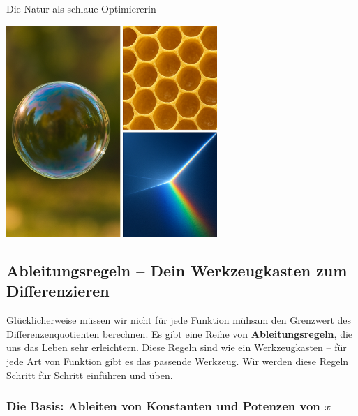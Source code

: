 \begin{funfactbox}{Die Natur als schlaue Optimiererin}
\begin{center}
    \includegraphics[width=0.6\textwidth]{grafiken/Natur_Optimierung.png}
    \label{fig:natur_optimierung_funfact} %
\end{center}
\end{funfactbox}

\subsection{Ableitungsregeln – Dein Werkzeugkasten zum Differenzieren}

Glücklicherweise müssen wir nicht für jede Funktion mühsam den Grenzwert des Differenzenquotienten berechnen. Es gibt eine Reihe von \textbf{Ableitungsregeln}, die uns das Leben sehr erleichtern. Diese Regeln sind wie ein Werkzeugkasten – für jede Art von Funktion gibt es das passende Werkzeug. Wir werden diese Regeln Schritt für Schritt einführen und üben.

\subsubsection{Die Basis: Ableiten von Konstanten und Potenzen von $x$}

